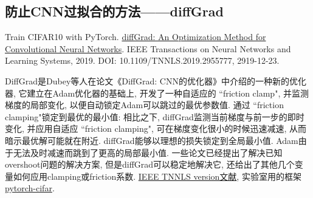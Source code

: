 \subsection{防止CNN过拟合的方法——diffGrad}
Train CIFAR10 with PyTorch. \href{https://ieeexplore.ieee.org/document/8939562}{diffGrad: An Optimization Method for Convolutional Neural Networks}. IEEE Transactions on Neural Networks and Learning Systems, 2019.
DOI: 10.1109/TNNLS.2019.2955777, 2919-12-23.

DiffGrad是Dubey等人在论文《DiffGrad: CNN的优化器》中介绍的一种新的优化器, 它建立在Adam优化器的基础上, 开发了一种自适应的 ``friction clamp", 并监测梯度的局部变化, 以便自动锁定Adam可以跳过的最优参数值.
通过 ``friction clamping"锁定到最优的最小值: 相比之下, diffGrad监测当前梯度与前一步的即时变化, 并应用自适应 ``friction clamping", 可在梯度变化很小的时候迅速减速, 从而暗示最优解可能就在附近.
diffGrad能够以理想的损失锁定到全局最小值. Adam由于无法及时减速而跳到了更高的局部最小值.
一些论文已经提出了解决已知overshoot问题的解决方案, 但是diffGrad可以稳定地解决它, 还给出了其他几个变量如何应用clamping或friction系数.
\href{https://ieeexplore.ieee.org/document/8939562}{IEEE TNNLS version文献}, 实验室用的框架 \href{https://github.com/kuangliu/pytorch-cifar}{pytorch-cifar}.
